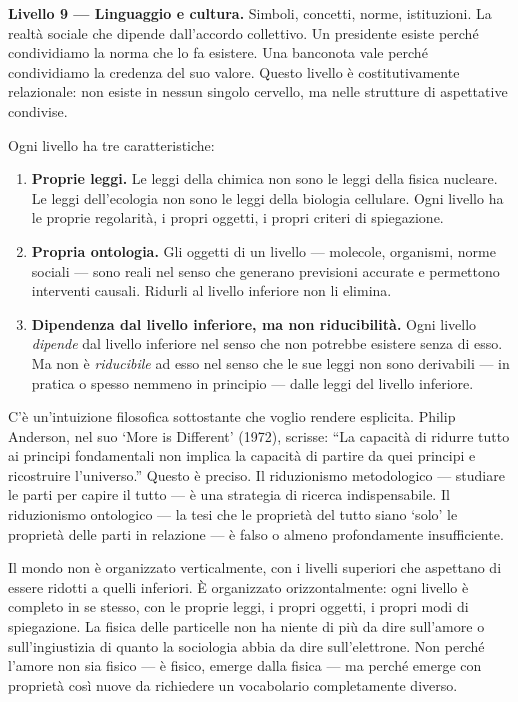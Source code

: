 \documentclass[12pt,a4paper,openany]{book}
\begin{document}
\textbf{Livello 9 — Linguaggio e cultura.} Simboli, concetti, norme, istituzioni. La realtà sociale che dipende dall'accordo collettivo. Un presidente esiste perché condividiamo la norma che lo fa esistere. Una banconota vale perché condividiamo la credenza del suo valore. Questo livello è costitutivamente relazionale: non esiste in nessun singolo cervello, ma nelle strutture di aspettative condivise.

\medskip

Ogni livello ha tre caratteristiche:

\begin{enumerate}
\item \textbf{Proprie leggi.} Le leggi della chimica non sono le leggi della fisica nucleare. Le leggi dell'ecologia non sono le leggi della biologia cellulare. Ogni livello ha le proprie regolarità, i propri oggetti, i propri criteri di spiegazione.

\item \textbf{Propria ontologia.} Gli oggetti di un livello — molecole, organismi, norme sociali — sono reali nel senso che generano previsioni accurate e permettono interventi causali. Ridurli al livello inferiore non li elimina.

\item \textbf{Dipendenza dal livello inferiore, ma non riducibilità.} Ogni livello \textit{dipende} dal livello inferiore nel senso che non potrebbe esistere senza di esso. Ma non è \textit{riducibile} ad esso nel senso che le sue leggi non sono derivabili — in pratica o spesso nemmeno in principio — dalle leggi del livello inferiore.
\end{enumerate}

\medskip

C'è un'intuizione filosofica sottostante che voglio rendere esplicita. Philip Anderson, nel suo `More is Different' (1972), scrisse: ``La capacità di ridurre tutto ai principi fondamentali non implica la capacità di partire da quei principi e ricostruire l'universo.'' Questo è preciso. Il riduzionismo metodologico — studiare le parti per capire il tutto — è una strategia di ricerca indispensabile. Il riduzionismo ontologico — la tesi che le proprietà del tutto siano `solo' le proprietà delle parti in relazione — è falso o almeno profondamente insufficiente.

Il mondo non è organizzato verticalmente, con i livelli superiori che aspettano di essere ridotti a quelli inferiori. È organizzato orizzontalmente: ogni livello è completo in se stesso, con le proprie leggi, i propri oggetti, i propri modi di spiegazione. La fisica delle particelle non ha niente di più da dire sull'amore o sull'ingiustizia di quanto la sociologia abbia da dire sull'elettrone. Non perché l'amore non sia fisico — è fisico, emerge dalla fisica — ma perché emerge con proprietà così nuove da richiedere un vocabolario completamente diverso.
\end{document}
